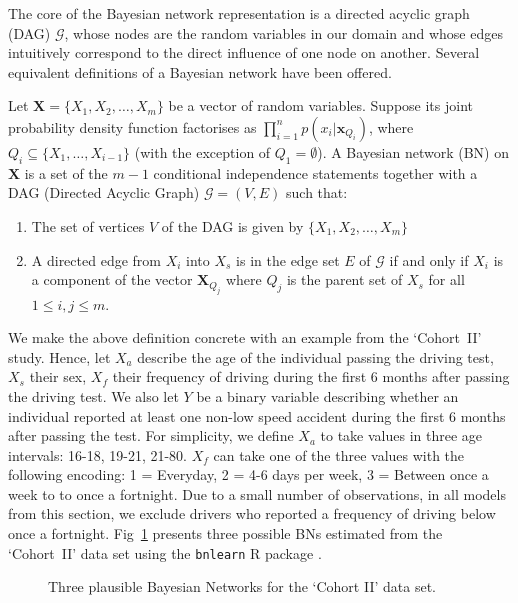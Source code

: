\documentclass[runningheads]{llncs}
\begin{document}
The core of the Bayesian network representation is a directed acyclic graph (DAG) $\mathcal{G}$, whose nodes are the random variables in our domain and whose edges intuitively correspond to the direct influence of one node on another. Several equivalent definitions of a Bayesian network have been offered.
\begin{definition}
Let $\boldsymbol{X} = \{X_1, X_2, \ldots, X_m\}$ be a vector of random variables. Suppose its joint probability density function factorises as $\prod_ {i=1}^{n} p(x_i | \boldsymbol{x}_{Q_i})$, where $Q_i \subseteq \{X_1,\ldots,X_{i-1}\}$ (with the exception of $Q_1 = \emptyset$). A Bayesian network (BN) on $\boldsymbol{X}$ is a set of the $m - 1$ conditional independence statements together with a DAG (Directed Acyclic Graph) $\mathcal{G} = (V, E)$ such that:
\begin{enumerate}[topsep=0pt]
    \item The set of vertices $V$ of the DAG is given by $\{X_1, X_2, \ldots, X_m\}$
    \item A directed edge from $X_i$ into $X_s$ is in the edge set $E$ of $\mathcal{G}$ if and only if $X_i$ is a component of the vector $\boldsymbol{X}_{Q_j}$ where $Q_j$ is the parent set of $X_s$ for all $1 \leq i, j \leq m$.
\end{enumerate}
\end{definition}
We make the above definition concrete with an example from the `Cohort~II' study. Hence, let $X_a$ describe the age of the individual passing the driving test, $X_s$ their sex, $X_f$ their frequency of driving during the first 6 months after passing the driving test. We also let $Y$ be a binary variable describing whether an individual reported at least one non-low speed accident during the first 6 months after passing the test. For simplicity, we define $X_a$ to take values in three age intervals: 16-18, 19-21, 21-80. $X_f$ can take one of the three values with the following encoding: 1 = Everyday,  2 = 4-6 days per week, 3 = Between once a week to to once a fortnight. Due to a small number of observations, in all models from this section, we exclude drivers who reported a frequency of driving below once a fortnight. Fig~\ref{bayesnets} presents three possible BNs estimated from the `Cohort~II' data set using the \texttt{bnlearn} R package \cite{bnlearn}.
\begin{figure}[ht]
\centering

\caption{Three plausible Bayesian Networks for the `Cohort II' data set.}
\label{bayesnets}
\end{figure}
\end{document}
